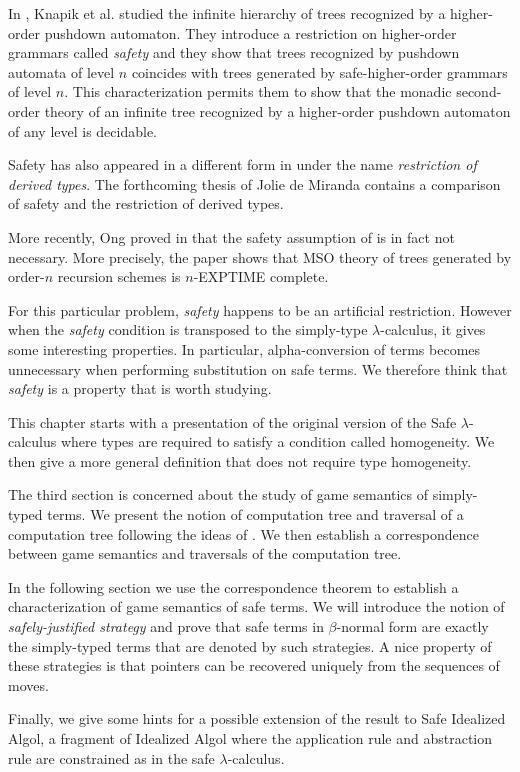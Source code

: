 
In \cite{KNU02}, Knapik et al. studied the infinite hierarchy of
trees recognized by a higher-order pushdown automaton. They
introduce a restriction on higher-order grammars called
\emph{safety} and they show that trees recognized by pushdown
automata of level $n$ coincides with trees generated by
safe-higher-order grammars of level $n$. This characterization
permits them to show that the monadic second-order theory of an
infinite tree recognized by a higher-order pushdown automaton of any
level is decidable.

Safety has also appeared in a different form in \cite{Dam82} under
the name \emph{restriction of derived types}. The forthcoming thesis
of Jolie de Miranda \citep{demirandathesis} contains a comparison of
safety and the restriction of derived types.

More recently, Ong proved in \cite{OngLics2006} that the safety
assumption of \cite{KNU02} is in fact not necessary. More precisely,
the paper shows that MSO theory of trees generated by order-$n$
recursion schemes is $n$-EXPTIME complete.

For this particular problem, \emph{safety} happens to be an
artificial restriction. However when the \emph{safety} condition is
transposed to the simply-type $\lambda$-calculus, it gives some
interesting properties. In particular, alpha-conversion of terms
becomes unnecessary when performing substitution on safe terms. We
therefore think that \emph{safety} is a property that is worth
studying.

This chapter starts with a presentation of the original version of
the Safe $\lambda$-calculus where types are required to satisfy a
condition called homogeneity. We then give a more general definition
that does not require type homogeneity.

The third section is concerned about the study of game semantics of
simply-typed terms. We present the notion of computation tree and
traversal of a computation tree following the ideas of
\cite{OngLics2006}. We then establish a correspondence between game
semantics and traversals of the computation tree.

In the following section we use the correspondence theorem to
establish a characterization of game semantics of safe terms. We
will introduce the notion of \emph{safely-justified strategy} and
prove that safe terms in $\beta$-normal form are exactly the
simply-typed terms that are denoted by such strategies. A nice
property of these strategies is that pointers can be recovered
uniquely from the sequences of moves.

Finally, we give some hints for a possible extension of the result
to Safe Idealized Algol, a fragment of Idealized Algol where the
application rule and abstraction rule are constrained as in the safe
$\lambda$-calculus.
